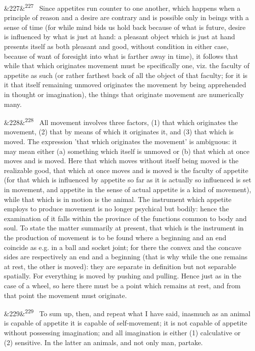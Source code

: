\documentclass[12pt]{article}
\newcommand{\para}[1][]{\par\noindent\ifx&#1&\else\textsuperscript{\footnotesize #1}~\fi}
\begin{document}
\para[227] Since appetites run counter to one another, which happens when a principle of reason and a desire are contrary and is possible only in beings with a sense of time (for while mind bids us hold back because of what is future, desire is influenced by what is just at hand: a pleasant object which is just at hand presents itself as both pleasant and good, without condition in either case, because of want of foresight into what is farther away in time), it follows that while that which originates movement must be specifically one, viz. the faculty of appetite as such (or rather farthest back of all the object of that faculty; for it is it that itself remaining unmoved originates the movement by being apprehended in thought or imagination), the things that originate movement are numerically many.

\para[228] All movement involves three factors, (1) that which originates the movement, (2) that by means of which it originates it, and (3) that which is moved. The expression 'that which originates the movement' is ambiguous: it may mean either (a) something which itself is unmoved or (b) that which at once moves and is moved. Here that which moves without itself being moved is the realizable good, that which at once moves and is moved is the faculty of appetite (for that which is influenced by appetite so far as it is actually so influenced is set in movement, and appetite in the sense of actual appetite is a kind of movement), while that which is in motion is the animal. The instrument which appetite employs to produce movement is no longer psychical but bodily: hence the examination of it falls within the province of the functions common to body and soul. To state the matter summarily at present, that which is the instrument in the production of movement is to be found where a beginning and an end coincide as e.g. in a ball and socket joint; for there the convex and the concave sides are respectively an end and a beginning (that is why while the one remains at rest, the other is moved): they are separate in definition but not separable spatially. For everything is moved by pushing and pulling. Hence just as in the case of a wheel, so here there must be a point which remains at rest, and from that point the movement must originate.

\para[229] To sum up, then, and repeat what I have said, inasmuch as an animal is capable of appetite it is capable of self-movement; it is not capable of appetite without possessing imagination; and all imagination is either (1) calculative or (2) sensitive. In the latter an animals, and not only man, partake.
\end{document}
